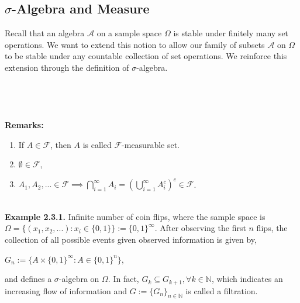 \documentclass{article}
\begin{document}
\subsection{$\sigma$-Algebra and Measure}
Recall that an algebra $\mathcal{A}$ on a sample space $\Omega$ is stable under finitely many set operations. We want to extend this notion to allow our family of subsets $\mathcal{A}$ on $\Omega$ to be stable under any countable collection of set operations. We reinforce this extension through the definition of $\sigma$-algebra.\\\\
\noindent{}\\\\\\
\textbf{Remarks:}
\begin{enumerate}
	\item If $A \in \mathcal{F}$, then $A$ is called $\mathcal{F}$-measurable set.
	\item $\emptyset \in \mathcal{F}$,
	\item $A_1, A_2,... \in \mathcal{F} \implies \bigcap_{i=1}^{\infty}A_i = (\bigcup_{i=1}^{\infty}A_i^c)^c \in \mathcal{F}$.
\end{enumerate}
\ \\ \textbf{Example 2.3.1.} Infinite number of coin flips, where the sample space is $\Omega = \{(x_1, x_2, ...): x_i \in \{0,1\}\} := \{0,1\}^{\infty}$. After observing the first $n$ flips, the collection of all possible events given observed information is given by,
\begin{center}
	$G_n := \{A \times \{0,1\}^{\infty}: A \in \{0,1\}^{n}\}$,
\end{center}
and defines a $\sigma$-algebra on $\Omega$. In fact, $G_k \subseteq G_{k+1}, \forall k \in \mathbb{N}$, which indicates an increasing flow of information and $G:= \{G_n\}_{n\in\mathbb{N}}$ is called a filtration.\\\\
\end{document}
